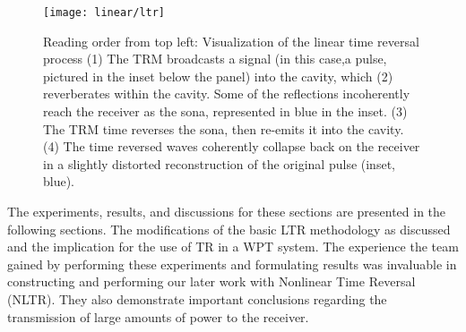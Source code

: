 \begin{figure}[h!]
\centering
\texttt{[image: linear/ltr]}
    \caption[Conceptual overview of linear time reversal]{Reading order from top left: Visualization of the linear time reversal process (1) The TRM broadcasts a signal (in this case,a pulse, pictured in the inset below the panel) into the cavity, which (2) reverberates within the cavity. Some of the reflections incoherently reach the receiver as the sona, represented in blue in the inset. (3) The TRM time reverses the sona, then re-emits it into the cavity. (4) The time reversed waves coherently collapse back on the receiver in a slightly distorted reconstruction of the original pulse (inset, blue).}
    \label{fig:linear-ltr}
\end{figure}

The experiments, results, and discussions for these sections are presented in the following sections. The modifications of the basic LTR methodology as discussed and the implication for the use of TR in a WPT system. The experience the team gained by performing these experiments and formulating results was invaluable in constructing and performing our later work with Nonlinear Time Reversal (NLTR). They also demonstrate important conclusions regarding the transmission of large amounts of power to the receiver.

